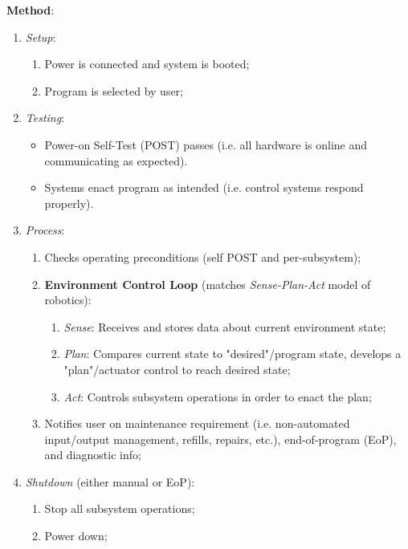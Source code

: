 \textbf{Method}:
\begin{enumerate}
    \item \textit{Setup}:
    \begin{enumerate}
        \item Power is connected and system is booted;
        \item Program is selected by user;
    \end{enumerate}
    \item \textit{Testing}:
    \begin{itemize}
        \item Power-on Self-Test (POST) passes (i.e. all hardware is online and communicating as expected).
        \item Systems enact program as intended (i.e. control systems respond properly).
    \end{itemize}
    \item \textit{Process}:
    \begin{enumerate}
        \item Checks operating preconditions (self POST and per-subsystem);
        \item \textbf{Environment Control Loop} (matches \textit{Sense-Plan-Act} model of robotics): %
        \begin{enumerate}
            \item \textit{Sense}: Receives and stores data about current environment state;
            \item \textit{Plan}: Compares current state to "desired"/program state, develops a "plan"/actuator control to reach desired state;
            \item \textit{Act}: Controls subsystem operations in order to enact the plan;
        \end{enumerate}
        \item Notifies user on maintenance requirement (i.e. non-automated input/output management, refills, repairs, etc.), end-of-program (EoP), and diagnostic info;
    \end{enumerate}
    \item \textit{Shutdown} (either manual or EoP):
    \begin{enumerate}
        \item Stop all subsystem operations;
        \item Power down;
    \end{enumerate}
\end{enumerate}

